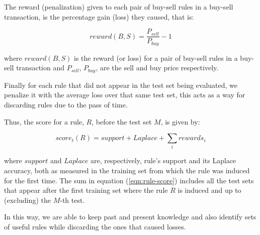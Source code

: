 \documentclass[preprint,3p,twocolumn]{elsarticle}
\begin{document}
The reward (penalization) given to each pair of buy-sell rules in a buy-sell transaction, is the percentage gain (loss) they caused, that is:

\begin{equation} \label{eqn:reward}
reward(B,S) = \dfrac{P_{sell} }{P_{buy}} -1 
\end{equation}

where $reward(B,S)$ is the reward (or loss) for a pair of buy-sell rules in a buy-sell transaction and $P_{sell}$, $P_{buy}$, are the sell and buy price respectively.

Finally for each rule that did not appear in the test set being evaluated, we penalize it with the average loss over that same test set, this acts as a way for discarding rules due to the pass of time.

Thus, the score for a rule, $R$, before the test set $M$, is given by:

\begin{equation} \label{eqn:rule-score}
score_{t}(R) = support + Laplace + \sum_{i} rewards_{i}
\end{equation}

where $support$ and $Laplace$ are, respectively, rule's support and its Laplace accuracy, both as measured in the training set from which the rule was induced for the first time. The sum in equation (\ref{eqn:rule-score}) includes all the test sets that appear after the first training set where the rule $R$ is induced and up to (excluding) the $M$-th test.

In this way, we are able to keep past and present knowledge and also identify sets of useful rules while discarding the ones that caused losses.
\end{document}
